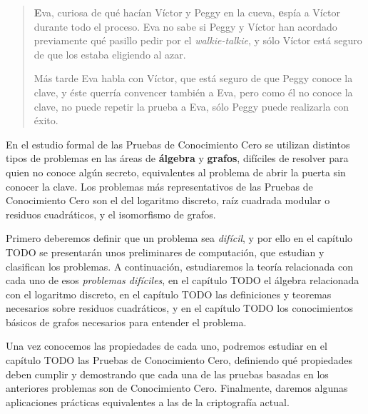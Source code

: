 \begin{quote}
\textbf{E}va, curiosa de qué hacían Víctor y Peggy en la cueva, \textbf{e}spía a Víctor durante todo el proceso. Eva no sabe si Peggy y Víctor han acordado previamente qué pasillo pedir por el \textit{walkie-talkie}, y sólo Víctor está seguro de que los estaba eligiendo al azar.%

Más tarde Eva habla con Víctor, que está seguro de que Peggy conoce la clave, y éste querría convencer también a Eva, pero como él no conoce la clave, no puede repetir la prueba a Eva, sólo Peggy puede realizarla con éxito.
\end{quote}


\hfil

En el estudio formal de las Pruebas de Conocimiento Cero se utilizan distintos tipos de problemas en las áreas de \textbf{álgebra} y \textbf{grafos}, difíciles de resolver para quien no conoce algún secreto, equivalentes al problema de abrir la puerta sin conocer la clave. Los problemas más representativos de las Pruebas de Conocimiento Cero son el del logaritmo discreto, raíz cuadrada modular o residuos cuadráticos, y el isomorfismo de grafos.

Primero deberemos definir que un problema sea \textit{difícil}, y por ello en el capítulo TODO se presentarán unos preliminares de computación, que estudian y clasifican los problemas. A continuación, estudiaremos la teoría relacionada con cada uno de esos \textit{problemas difíciles}, en el capítulo TODO el álgebra relacionada con el logaritmo discreto, en el capítulo TODO las definiciones y teoremas necesarios sobre residuos cuadráticos, y en el capítulo TODO los conocimientos básicos de grafos necesarios para entender el problema.

Una vez conocemos las propiedades de cada uno, podremos estudiar en el capítulo TODO las Pruebas de Conocimiento Cero, definiendo qué propiedades deben cumplir y demostrando que cada una de las pruebas basadas en los anteriores problemas son de Conocimiento Cero. Finalmente, daremos algunas aplicaciones prácticas equivalentes a las de la criptografía actual.






















